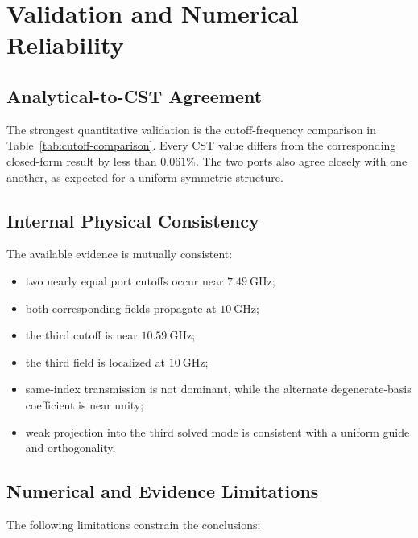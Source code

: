 \section{Validation and Numerical Reliability}
\label{sec:validation-reliability}

\subsection{Analytical-to-CST Agreement}

The strongest quantitative validation is the cutoff-frequency comparison in Table~\ref{tab:cutoff-comparison}. Every CST value differs from the corresponding closed-form result by less than \(0.061\%\). The two ports also agree closely with one another, as expected for a uniform symmetric structure.

\subsection{Internal Physical Consistency}

The available evidence is mutually consistent:

\begin{itemize}
  \item two nearly equal port cutoffs occur near \(7.49~\mathrm{GHz}\);
  \item both corresponding fields propagate at \(10~\mathrm{GHz}\);
  \item the third cutoff is near \(10.59~\mathrm{GHz}\);
  \item the third field is localized at \(10~\mathrm{GHz}\);
  \item same-index transmission is not dominant, while the alternate degenerate-basis coefficient is near unity;
  \item weak projection into the third solved mode is consistent with a uniform guide and orthogonality.
\end{itemize}

\subsection{Numerical and Evidence Limitations}

The following limitations constrain the conclusions:

